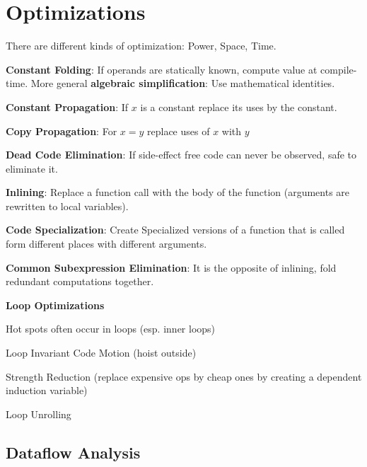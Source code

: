 \section*{Optimizations}

There are different kinds of optimization: Power, Space, Time.

\begin{compactitem}[$\quad\bullet$]
	\item \textbf{Constant Folding}: If operands are statically known, compute value at compile-time. More general \textbf{algebraic simplification}: Use mathematical identities.

	\item \textbf{Constant Propagation}: If $x$ is a constant replace its uses by the constant.

	\item \textbf{Copy Propagation}: For $x = y$ replace uses of $x$ with $y$

	\item \textbf{Dead Code Elimination}: If side-effect free code can never be observed, safe to eliminate it.

	\item \textbf{Inlining}: Replace a function call with the body of the function (arguments are rewritten to local variables).

	\item \textbf{Code Specialization}: Create Specialized versions of a function that is called form different places with different arguments.

	\item \textbf{Common Subexpression Elimination}: It is the opposite of inlining, fold redundant computations together.

	\item \textbf{Loop Optimizations}
	\begin{compactitem}[$\quad\bullet$]
		\item Hot spots often occur in loops (esp. inner loops)
		\item Loop Invariant Code Motion (hoist outside)
		\item Strength Reduction (replace expensive ops by cheap ones by creating a dependent induction variable)
		\item Loop Unrolling
	\end{compactitem}
\end{compactitem}


\subsection*{Dataflow Analysis}

